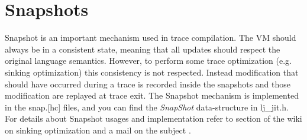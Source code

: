 
\section{Snapshots}
\label{Sec:snap}

Snapshot is an important mechanism used in trace compilation. The VM should
always be in a consistent state, meaning that all updates should respect the
original language semantics. However, to perform some trace optimization
(e.g. sinking optimization) this consistency is not respected. Instead
modification that should have occurred during a trace is recorded inside the
snapshots and those modification are replayed at trace exit. The Snapshot
mechanism is implemented in the snap.[hc] files, and you can find the
\emph{SnapShot} data-structure in lj\_jit.h. For details about
Snapshot usages and implementation refer to section of the wiki on sinking
optimization \cite{luajit-sink} and a mail on the subject \cite{luajit-mail-1}.

